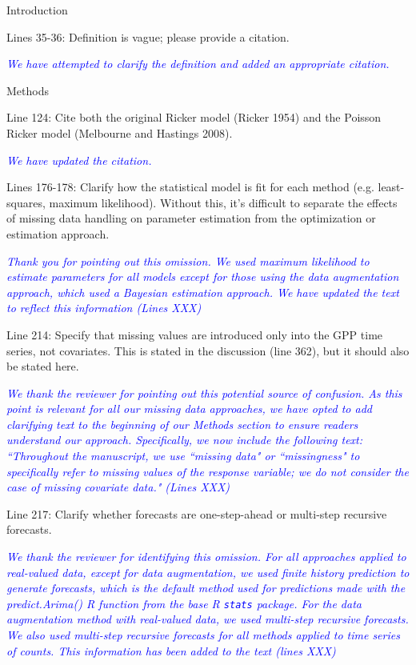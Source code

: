 \documentclass{article}
\begin{document}
\begin{linenumbers}
Introduction

Lines 35-36: Definition is vague; please provide a citation.

\noindent \textcolor{blue}{\textit{We have attempted to clarify the definition and added an appropriate citation.}} 

\bigskip

Methods

Line 124: Cite both the original Ricker model (Ricker 1954) and the Poisson Ricker model (Melbourne and Hastings 2008).

\noindent \textcolor{blue}{\textit{We have updated the citation.}} 

\bigskip

Lines 176-178: Clarify how the statistical model is fit for each method (e.g. least-squares, maximum likelihood). Without this, it’s difficult to separate the effects of missing data handling on parameter estimation from the optimization or estimation approach.

\noindent \textcolor{blue}{\textit{Thank you for pointing out this omission. We used maximum likelihood to estimate parameters for all models except for those using the data augmentation approach, which used a Bayesian estimation approach. We have updated the text to reflect this information (Lines XXX)}} 

Line 214: Specify that missing values are introduced only into the GPP time series, not covariates. This is stated in the discussion (line 362), but it should also be stated here.

\noindent \textcolor{blue}{\textit{We thank the reviewer for pointing out this potential source of confusion. As this point is relevant for all our missing data approaches, we have opted to add clarifying text to the beginning of our Methods section to ensure readers understand our approach. Specifically, we now include the following text: ``Throughout the manuscript, we use ``missing data" or ``missingness" to specifically refer to missing values of the response variable; we do not consider the case of missing covariate data." (Lines XXX)}} 

\bigskip 

Line 217: Clarify whether forecasts are one-step-ahead or multi-step recursive forecasts.

\noindent \textcolor{blue}{\textit{We thank the reviewer for identifying this omission. For all approaches applied to real-valued data, except for data augmentation, we used finite history prediction to generate forecasts, which is the default method used for predictions made with the predict.Arima() R function from the base R \texttt{stats} package. For the data augmentation method with real-valued data, we used multi-step recursive forecasts. We also used multi-step recursive forecasts for all methods applied to time series of counts. This information has been added to the text (lines XXX) }}


\end{linenumbers}
\end{document}
